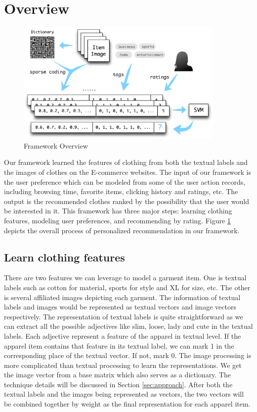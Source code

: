 \section{Overview}\label{sec:overview}

\begin{figure}
  \centering
  \includegraphics[width=0.9\textwidth]{framework}
  \caption{Framework Overview}
  \label{fig:overview}
\end{figure}

Our framework learned the features of clothing from both the textual labels and the images of clothes on the E-commerce websites. The input of our framework is the user preference which can be modeled from some of the user action records, including browsing time, favorite items, clicking history and ratings, etc. The output is the recommended clothes ranked by the possibility that the user would be interested in it. This framework has three major steps: learning clothing features,
modeling user preferences, and recommending by rating. Figure \ref{fig:overview} depicts the overall process of personalized recommendation in our framework.

\subsection{Learn clothing features}
There are two features we can leverage to model a garment item. One is textual labels such as cotton for material, sports for style and XL for size, etc. The other is several affiliated images depicting each garment. The information of textual labels and images would be represented as textual vectors and image vectors respectively. The representation of textual labels is quite straightforward as we can extract all the possible adjectives like slim, loose, lady and cute in the textual
labels. Each adjective represent a feature of the apparel in textual level. If the apparel item contains that feature in its textual label, we can mark 1 in the corresponding place of the textual vector. If not, mark 0. The image processing is more complicated than textual processing to learn the representations. We get the image vector from a base matrix which also serves as a dictionary. The technique details will be discussed in Section \ref{sec:approach}. After both the textual labels
and the images being represented as vectors, the two vectors will be combined together by weight as the final representation for each apparel item.

